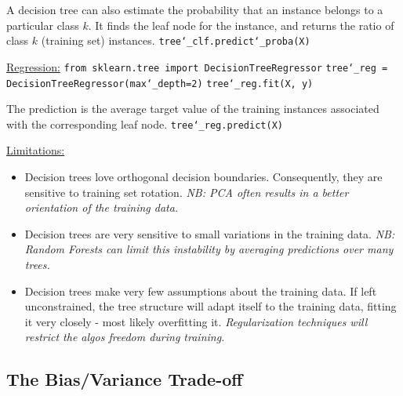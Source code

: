A decision tree can also estimate the probability
that an instance belongs to a particular class $k$.\newline
% 
It finds the leaf node for the instance,
and returns the ratio of class $k$ (training set) instances.\newline
\texttt{tree\char`_clf.predict\char`_proba(X)}\newline

\underline{Regression:}\newline
\texttt{from sklearn.tree import DecisionTreeRegressor}\newline
\texttt{tree\char`_reg = DecisionTreeRegressor(max\char`_depth=2)}\newline
\texttt{tree\char`_reg.fit(X, y)}

The prediction is the average target value of the
training instances associated with the corresponding leaf node.\newline
\texttt{tree\char`_reg.predict(X)}\newline

\underline{Limitations:}
\vspace{-3.0mm}
\begin{itemize}
\item
Decision trees love orthogonal decision boundaries.
Consequently, they are sensitive to training set rotation.
\textit{NB: PCA often results in a better orientation of the training data.}
\item
Decision trees are very sensitive to small variations in the training data.\newline
\textit{NB: Random Forests can limit this instability by averaging predictions over many trees.}
\item
Decision trees make very few assumptions about the training data.
If left unconstrained, the tree structure will adapt itself to the training data,
fitting it very closely - most likely overfitting it.
\textit{Regularization techniques will restrict the algos freedom during training.}
\end{itemize}


\subsection{The Bias/Variance Trade-off}

